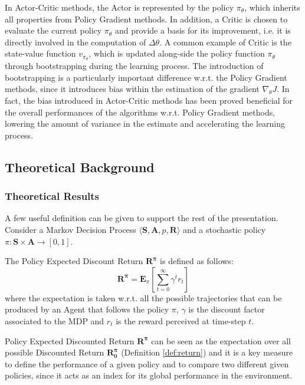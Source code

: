                 In Actor-Critic methods, the Actor is represented by the policy $\pi_\theta$, which inherits all properties from Policy Gradient methods. In addition, a Critic is chosen to evaluate the current policy $\pi_\theta$ and provide a basis for its improvement, i.e. it is directly involved in the computation of $\Delta\theta$. A common example of Critic is the state-value function $v_{\pi_{\theta}}$, which is updated along-side the policy function $\pi_\theta$ through bootstrapping during the learning process. The introduction of bootstrapping is a particularly important difference w.r.t. the Policy Gradient methods, since it introduces bias within the estimation of the gradient $\nabla_{\theta}J$. In fact, the bias introduced in Actor-Critic methods has been proved beneficial for the overall performances of the algorithms w.r.t. Policy Gradient methods, lowering the amount of variance in the estimate and accelerating the learning process.
                
        \subsection{Theoretical Background}
        \label{subs:theoretical_background}
            \subsubsection{Theoretical Results}
                A few useful definition can be given to support the rest of the presentation. Consider a Markov Decision Process $\langle \mathbf{S}, \mathbf{A}, p, \mathbf{R}\rangle$ and a stochastic policy $\pi : \mathbf{S} \times \mathbf{A} \rightarrow [0, 1]$.
                
                \begin{definition}
                    \label{def:policyreturn}
                    The Policy Expected Discount Return $\mathbf{R^{\pi}}$ is defined as follows:
                    \[ \mathbf{R^{\pi}} =  \mathbf{E}_{\pi} \left[ \sum_{t=0}^\infty \gamma^t r_{t} \right] \]
                    where the expectation is taken w.r.t. all the possible trajectories that can be produced by an Agent that follows the policy $\pi$, $\gamma$ is the discount factor associated to the MDP and $r_t$ is the reward perceived at time-step $t$.
                \end{definition}
                \noindent
                Policy Expected Discounted Return $\mathbf{R^{\pi}}$ can be seen as the expectation over all possible Discounted Return $\mathbf{R_{0}^{\pi}}$ (Definition \ref{def:return}) and it is a key measure to define the performance of a given policy and to compare two different given policies, since it acts as an index for its global performance in the environment.
                
